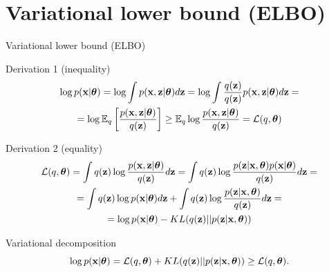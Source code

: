 \section{Variational lower bound (ELBO)}
\begin{frame}{Variational lower bound (ELBO)}
	\begin{block}{Derivation 1 (inequality)}
		\vspace{-0.7cm}
		\begin{multline*}
			\log p(\mathbf{x}| \boldsymbol{\theta}) 
			= \log \int p(\mathbf{x}, \mathbf{z} | \boldsymbol{\theta}) d\mathbf{z} = \log \int \frac{q(\mathbf{z})}{q(\mathbf{z})} p(\mathbf{x}, \mathbf{z} | \boldsymbol{\theta}) d\mathbf{z} = \\
			= \log \mathbb{E}_{q} \left[\frac{p(\mathbf{x}, \mathbf{z}| \boldsymbol{\theta})}{q(\mathbf{z})} \right] \geq \mathbb{E}_{q} \log \frac{p(\mathbf{x}, \mathbf{z}| \boldsymbol{\theta})}{q(\mathbf{z})} =  \mathcal{L}(q, \boldsymbol{\theta})
		\end{multline*}
		\vspace{-0.7cm}
	\end{block}
	\begin{block}{Derivation 2 (equality)}
		\vspace{-0.7cm}
		\begin{multline*}
			\mathcal{L} (q, \boldsymbol{\theta}) = \int q(\mathbf{z}) \log \frac{p(\mathbf{x}, \mathbf{z} | \boldsymbol{\theta})}{q(\mathbf{z})}d\mathbf{z} = 
			\int q(\mathbf{z}) \log \frac{p(\mathbf{z}|\mathbf{x}, \boldsymbol{\theta})p(\mathbf{x}| \boldsymbol{\theta})}{q(\mathbf{z})}d\mathbf{z} = \\
			= \int q(\mathbf{z}) \log p(\mathbf{x}| \boldsymbol{\theta}) d\mathbf{z} + \int q(\mathbf{z}) \log \frac{p(\mathbf{z}|\mathbf{x}, \boldsymbol{\theta})}{q(\mathbf{z})}d\mathbf{z} = \\
			= \log p(\mathbf{x}| \boldsymbol{\theta}) - KL(q(\mathbf{z}) || p(\mathbf{z}|\mathbf{x}, \boldsymbol{\theta}))
		\end{multline*}
	\end{block}
	\vspace{-0.7cm}
	\begin{block}{Variational decomposition}
		\[
			\log p(\mathbf{x}| \boldsymbol{\theta}) = \mathcal{L} (q, \boldsymbol{\theta}) + KL(q(\mathbf{z}) || p(\mathbf{z}|\mathbf{x}, \boldsymbol{\theta})) \geq \mathcal{L} (q, \boldsymbol{\theta}).
		\]
	\end{block}
\end{frame}
